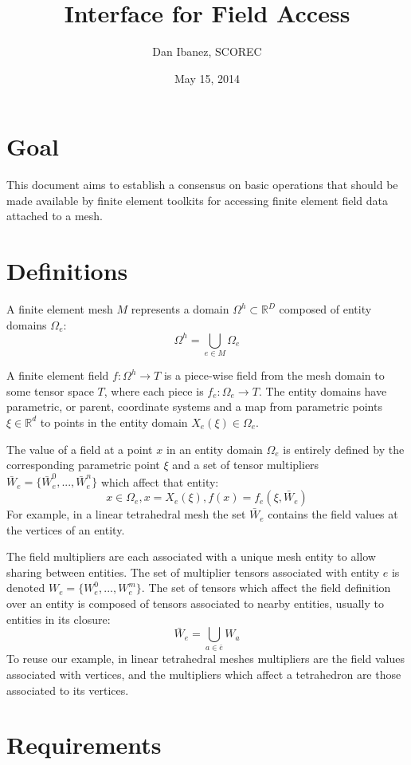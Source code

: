 \documentclass{article}
\title{Interface for Field Access}
\author{Dan Ibanez, SCOREC}
\date{May 15, 2014}
\begin{document}
\maketitle

\section{Goal}

This document aims to establish a consensus on
basic operations that should be made available
by finite element toolkits for accessing finite
element field data attached to a mesh.

\section{Definitions}

A finite element mesh $M$ represents a domain
$\Omega^h \subset {\mathbb R^D}$
composed of entity domains $\Omega_e$:
\[\Omega^h = \bigcup_{e\in M} \Omega_e\]

A finite element field $f : \Omega^h \to T$ is a piece-wise field
from the mesh domain to some tensor space $T$, where
each piece is $f_e : \Omega_e \to T$.
The entity domains have parametric, or parent, coordinate
systems and a map from parametric points $\xi \in {\mathbb R^d}$
to points in the entity domain $X_e(\xi) \in \Omega_e$.

The value of a field at a point $x$ in an entity domain $\Omega_e$
is entirely defined by the corresponding parametric point $\xi$
and a set of tensor multipliers $\bar{W}_e = \{\bar{W}_e^0,...,\bar{W}_e^n\}$
which affect that entity:
\[x\in \Omega_e, x = X_e(\xi), f(x) = f_e(\xi,\bar{W}_e)\]
For example, in a linear tetrahedral mesh the set $\bar{W}_e$ contains
the field values at the vertices of an entity.

The field multipliers are each associated with a unique mesh entity
to allow sharing between entities.
The set of multiplier tensors associated with entity $e$ is denoted
$W_e = \{W_e^0,...,W_e^m\}$.
The set of tensors which affect the field definition over an entity
is composed of tensors associated to nearby entities, usually to
entities in its closure:
\[\bar{W}_e = \bigcup_{a \in \bar{e}} W_a\]
To reuse our example, in linear tetrahedral meshes multipliers are
the field values associated with vertices, and the multipliers
which affect a tetrahedron are those associated to its vertices.

\section{Requirements}
\end{document}
